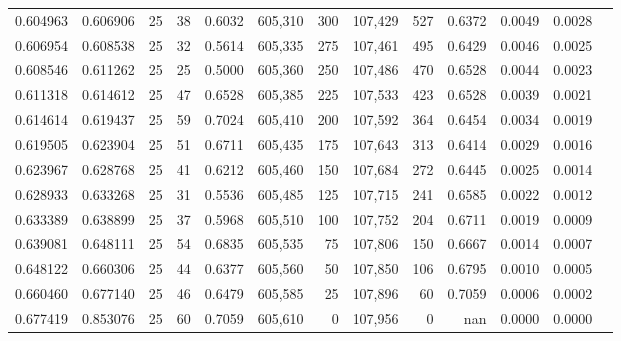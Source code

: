 \begin{tabular}{rrrrrrrrrrrrr}
0.604963 & 0.606906 &    25 &  38 &                                     0.6032 & 605,310 &     300 & 107,429 &     527 & 0.6372 & 0.0049 & 0.0028 \\
0.606954 & 0.608538 &    25 &  32 &                                     0.5614 & 605,335 &     275 & 107,461 &     495 & 0.6429 & 0.0046 & 0.0025 \\
0.608546 & 0.611262 &    25 &  25 &                                     0.5000 & 605,360 &     250 & 107,486 &     470 & 0.6528 & 0.0044 & 0.0023 \\
0.611318 & 0.614612 &    25 &  47 &                                     0.6528 & 605,385 &     225 & 107,533 &     423 & 0.6528 & 0.0039 & 0.0021 \\
0.614614 & 0.619437 &    25 &  59 &                                     0.7024 & 605,410 &     200 & 107,592 &     364 & 0.6454 & 0.0034 & 0.0019 \\
0.619505 & 0.623904 &    25 &  51 &                                     0.6711 & 605,435 &     175 & 107,643 &     313 & 0.6414 & 0.0029 & 0.0016 \\
0.623967 & 0.628768 &    25 &  41 &                                     0.6212 & 605,460 &     150 & 107,684 &     272 & 0.6445 & 0.0025 & 0.0014 \\
0.628933 & 0.633268 &    25 &  31 &                                     0.5536 & 605,485 &     125 & 107,715 &     241 & 0.6585 & 0.0022 & 0.0012 \\
0.633389 & 0.638899 &    25 &  37 &                                     0.5968 & 605,510 &     100 & 107,752 &     204 & 0.6711 & 0.0019 & 0.0009 \\
0.639081 & 0.648111 &    25 &  54 &                                     0.6835 & 605,535 &      75 & 107,806 &     150 & 0.6667 & 0.0014 & 0.0007 \\
0.648122 & 0.660306 &    25 &  44 &                                     0.6377 & 605,560 &      50 & 107,850 &     106 & 0.6795 & 0.0010 & 0.0005 \\
0.660460 & 0.677140 &    25 &  46 &                                     0.6479 & 605,585 &      25 & 107,896 &      60 & 0.7059 & 0.0006 & 0.0002 \\
0.677419 & 0.853076 &    25 &  60 &                                     0.7059 & 605,610 &       0 & 107,956 &       0 &    nan & 0.0000 & 0.0000 \\
\bottomrule
\end{tabular}
